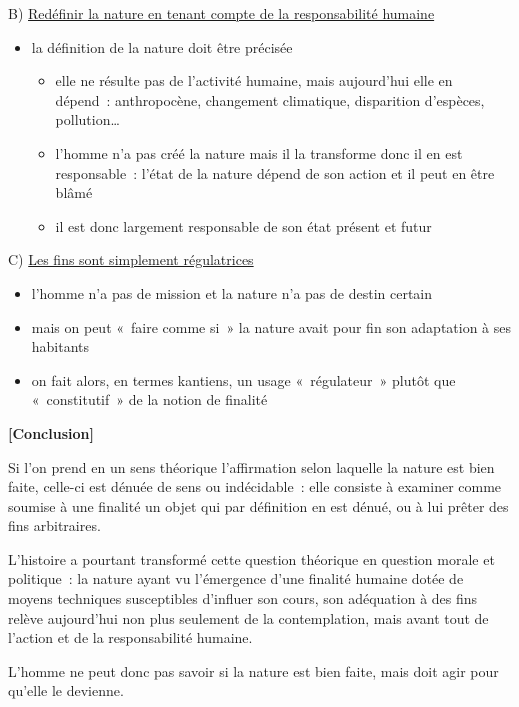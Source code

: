 \documentclass[a4paper,12pt]{report}
\begin{document}
\medskip

B) \uline{Redéfinir la nature en tenant compte de la responsabilité humaine}
\begin{itemize}
\item la définition de la nature doit être précisée
\begin{itemize}
\item elle ne résulte pas de l'activité humaine, mais aujourd'hui elle en
dépend : anthropocène, changement climatique, disparition d'espèces,
pollution\ldots{}
\item l'homme n'a pas créé la nature mais il la transforme donc il en est
responsable : l'état de la nature dépend de son action et il peut en
être blâmé
\item il est donc largement responsable de son état présent et futur
\end{itemize}
\end{itemize}

\medskip

C) \uline{Les fins sont simplement régulatrices}
\begin{itemize}
\item l'homme n'a pas de mission et la nature n'a pas de destin certain
\item mais on peut « faire comme si » la nature avait pour fin son
adaptation à ses habitants
\item on fait alors, en termes kantiens, un usage « régulateur » plutôt que
« constitutif » de la notion de finalité
\end{itemize}

\bigskip


\textbf{[Conclusion]}

Si l'on prend en un sens théorique
l'affirmation selon laquelle la nature est bien faite, celle-ci est
dénuée de sens ou indécidable : elle consiste à examiner comme soumise à
une finalité un objet qui par définition en est dénué, ou à lui prêter
des fins arbitraires.

L'histoire a pourtant transformé cette question théorique en question
morale et politique : la nature ayant vu l'émergence d'une finalité
humaine dotée de moyens techniques susceptibles d'influer son cours, son
adéquation à des fins relève aujourd'hui non plus seulement de la
contemplation, mais avant tout de l'action et de la responsabilité
humaine.

L'homme ne peut donc pas savoir si la nature
est bien faite, mais doit agir pour qu'elle le devienne.
\end{document}
